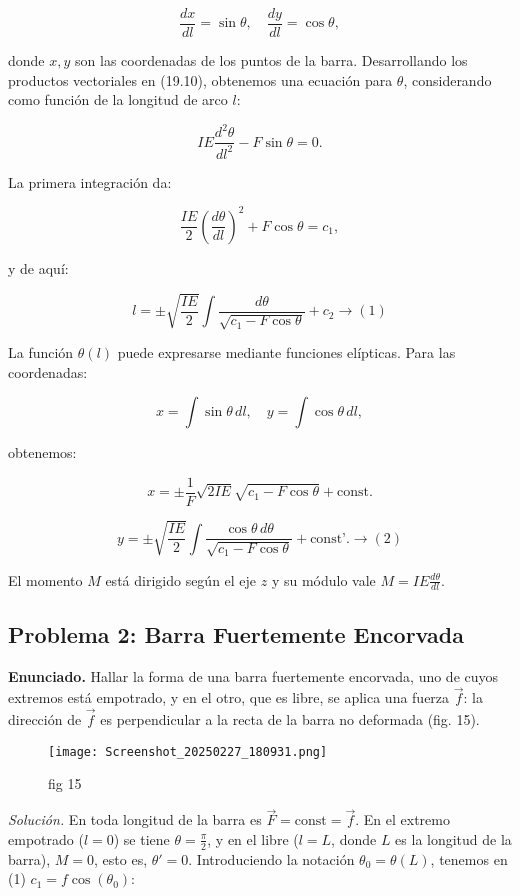\documentclass{article}
\begin{document}
$$
\frac{dx}{dl} = \sin \theta, \quad \frac{dy}{dl} = \cos \theta,
$$

donde $x, y$ son las coordenadas de los puntos de la barra. Desarrollando los productos vectoriales en (19.10), obtenemos una ecuación para $\theta$, considerando como función de la longitud de arco $l$:

$$
IE \frac{d^2 \theta}{dl^2} - F \sin \theta = 0.
$$

La primera integración da:

$$
\frac{IE}{2} \left( \frac{d\theta}{dl} \right)^2 + F \cos \theta = c_1,
$$

y de aquí:

$$
l = \pm \sqrt{\frac{IE}{2}} \int \frac{d\theta}{\sqrt{c_1 - F \cos \theta}} + c_2 \rightarrow (1)
$$

La función $\theta(l)$ puede expresarse mediante funciones elípticas. Para las coordenadas:

$$
x = \int \sin \theta \, dl, \quad y = \int \cos \theta \, dl,
$$

obtenemos:

$$
x = \pm \frac{1}{F} \sqrt{2IE} \sqrt{c_1 - F \cos \theta} + \text{const.}
$$

$$
y = \pm \sqrt{\frac{IE}{2}} \int \frac{\cos \theta \, d\theta}{\sqrt{c_1 - F \cos \theta}} + \text{const'.} \rightarrow (2)
$$

El momento $M$ está dirigido según el eje $z$ y su módulo vale $M = IE \frac{d\theta}{dl}$.

\subsection*{Problema 2: Barra Fuertemente Encorvada}
\textbf{Enunciado.} Hallar la forma de una barra fuertemente encorvada, uno de cuyos extremos está empotrado, y en el otro, que es libre, se aplica una fuerza $\vec{f}$: la dirección de $\vec{f}$ es perpendicular a la recta de la barra no deformada (fig. 15).
\begin{figure}[h]
    \centering
    \texttt{[image: Screenshot\_20250227\_180931.png]}
    \caption{fig 15}
\end{figure}

\textit{Solución.} En toda longitud de la barra es $\vec{F} = \text{const} = \vec{f}$. En el extremo empotrado ($l = 0$) se tiene $\theta = \frac{\pi}{2}$, y en el libre ($l = L$, donde $L$ es la longitud de la barra), $M = 0$, esto es, $\theta' = 0$. Introduciendo la notación $\theta_0 = \theta(L)$, tenemos en (1) $c_1 =f\cos(\theta_0)$:
\end{document}

